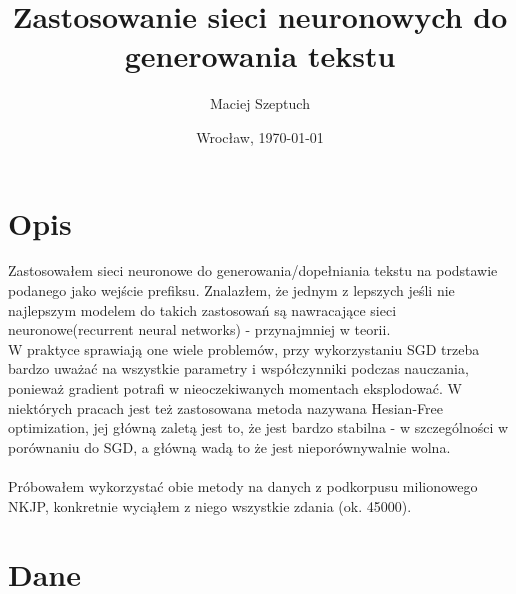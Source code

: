 \documentclass[11pt,leqno]{article}
\title{Zastosowanie sieci neuronowych do generowania tekstu}
\author{Maciej Szeptuch}
\date{Wrocław, \today}
\begin{document}
\thispagestyle{empty}
\maketitle

\section{Opis}
Zastosowałem sieci neuronowe do generowania/dopełniania tekstu na podstawie podanego jako wejście prefiksu.
Znalazłem, że jednym z lepszych jeśli nie najlepszym modelem do takich zastosowań są nawracające sieci neuronowe(recurrent neural networks) - przynajmniej w teorii. \\
W praktyce sprawiają one wiele problemów, przy wykorzystaniu SGD trzeba bardzo uważać na wszystkie parametry i współczynniki podczas nauczania, ponieważ gradient potrafi w nieoczekiwanych momentach eksplodować.
W niektórych pracach jest też zastosowana metoda nazywana Hesian-Free optimization, jej główną zaletą jest to, że jest bardzo stabilna - w szczególności w porównaniu do SGD, a główną wadą to że jest nieporównywalnie wolna.
\\\\
Próbowałem wykorzystać obie metody na danych z podkorpusu milionowego NKJP, konkretnie wyciąłem z niego wszystkie zdania (ok. 45000).

\section{Dane}
\end{document}
